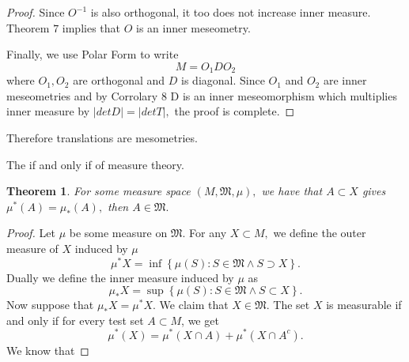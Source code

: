 \documentclass[letter]{article}
\newtheorem{theorem}{Theorem}
\newenvironment{menumerate}{%
  \edef\backupindent{\the\parindent}%
  \enumerate%
  \setlength{\parindent}{\backupindent}%
}{\endenumerate}
\begin{document}
\begin{menumerate}
\begin{proof}
		Since $O^{-1}$ is also orthogonal, it too does not increase inner measure. Theorem $7$ implies that $O$ is an inner meseometry.

		Finally, we use Polar Form to write
		\begin{equation}
			M = O_1 D O_2
		\end{equation}
		where $O_1, O_2$ are orthogonal and $D$ is diagonal. Since $O_1$ and $O_2$ are inner meseometries and by Corrolary $8$ D is an inner meseomorphism which multiplies inner measure by $|det D| =|det T|,$ the proof is complete. 
	\end{proof}
	Therefore translations are mesometries.

	\setcounter{enumi}{8}
	\item The if and only if of measure theory.
	\begin{theorem}
		For some measure space $(M, \mathfrak{M}, \mu),$ we have that $A \subset X$ gives $\mu^*(A) = \mu_*(A),$ then $A \in \mathfrak{M}.$
	\end{theorem}
	\begin{proof}
		Let $\mu$ be some measure on $\mathfrak{M}.$ For any $X \subset M,$ we define
		the outer measure of $X$ induced by $\mu$
		\begin{equation}
			\mu^*X = \inf\left\{\mu(S): S \in \mathfrak{M} \wedge S \supset X\right\}.
		\end{equation}
		Dually we define the inner measure induced by $\mu$ as
		\begin{equation}
				\mu_*X = \sup\left\{\mu(S): S \in \mathfrak{M} \wedge S \subset X\right\}.
		\end{equation}
		Now suppose that $\mu_*X = \mu^*X.$ We claim that $X \in \mathfrak{M}.$ 
		The set $X$ is measurable if and only if for every test set $A \subset M$,
		we get
		\begin{equation}
			\mu^*(X) = \mu^*(X \cap A) + \mu^*(X \cap A^c).
		\end{equation}
		We know that 
	\end{proof}
\end{menumerate} 
\end{document}
